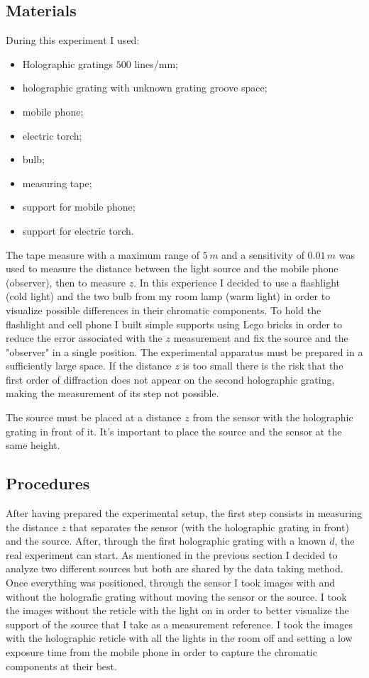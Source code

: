 \subsection{Materials}
During this experiment I used:
\begin{itemize}
    \item Holographic gratings $500$ lines/mm;
    \item holographic grating with unknown grating groove space;
    \item mobile phone;
    \item electric torch;
    \item bulb;
    \item measuring tape;
    \item support for mobile phone;
    \item support for electric torch.
\end{itemize}
The tape measure with a maximum range of $ 5 \, m $ and a sensitivity of $ 0.01 \, m $ was used to measure the distance between the light source and the mobile phone (observer), then to measure $ z $. In this experience I decided to use a flashlight (cold light) and the two bulb from my room lamp (warm light) in order to visualize possible differences in their chromatic components. To hold the flashlight and cell phone I built simple supports using Lego bricks in order to reduce the error associated with the $ z $ measurement and fix the source and the "observer" in a single position.
The experimental apparatus must be prepared in a sufficiently large space. If the distance $ z $ is too small there is the risk that the first order of diffraction does not appear on the second holographic grating, making the measurement of its step not possible. 

The source must be placed at a distance $ z $ from the sensor with the holographic grating in front of it. It's important to place the source and the sensor at the same height.

\subsection{Procedures}
After having prepared the experimental setup, the first step consists in measuring the distance $ z $ that separates the sensor (with the holographic grating in front) and the source. After, through the first holographic grating with a known $d$, the real experiment can start. As mentioned in the previous section I decided to analyze two different sources but both are shared by the data taking method. Once everything was positioned, through the sensor I took images with and without the holografic grating without moving the sensor or the source. I took the images without the reticle with the light on in order to better visualize the support of the source that I take as a measurement reference. I took the images with the holographic reticle with all the lights in the room off and setting a low exposure time from the mobile phone in order to capture the chromatic components at their best.

